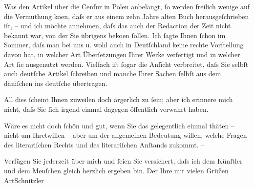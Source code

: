 \pstart
           Was den Artikel über die Cenſur in
                     Polen anbelangt,{ }ſo werden freilich wenige auf die Vermuthung ko{\geminationm}en, daſs er aus einem {\pb}zehn Jahre alten Buch herausgeſchrieben iſt, – und
               ich möchte annehmen, daſs das auch der Redaction der Zeit nicht bekannt war, von der Sie übrigens \label{K_L00602-1v}\label{K_L00602-1} beko{\geminationm}en{ }ſollen. Ich{ }ſagte Ihnen{ }ſchon im Sommer, daſs man bei uns u. wohl auch in Deutſchland keine rechte Vorſtellung davon hat, in
               welcher Art Überſetzungen Ihrer Werke verfertigt und in welcher Art{ }ſie ausgenutzt
               werden. Vielfach iſt{ }ſogar die Anſicht verbreitet, daſs Sie selbſt auch deutſche
               Artikel{ }ſchreiben und manche Ihrer Sachen{ }ſelbſt aus dem däniſchen ins deutſche übertragen.\pend
           
\pstart
           {\pb}All dies{ }ſcheint Ihnen zuweilen doch ärgerlich zu{ }ſein; aber ich erinnere mich nicht, daſs Sie{ }ſich irgend einmal dagegen öffentlich
               verwahrt haben.\pend
           
\pstart
           Wäre es nicht doch{ }ſchön und gut, wenn Sie das gelegentlich einmal thäten – nicht um
               Ihretwillen – aber um der allgemeinen Bedeutung willen, welche Fragen des
               literariſchen Rechts und des literariſchen Anſtands zukommt. –\pend
           
\pstart
           Verfügen Sie jederzeit über mich und{ }ſeien Sie versichert, daſs ich dem Künſtler und
               dem Menſchen gleich herzlich ergeben bin.\pend
           \pstart Der Ihre mit vielen Grüßen \spacefill\mbox{ArtSchnitzler}\pend{}\endnumbering{}  \newcommand{\dateiname}{L00602}\newcommand{\titel}{Arthur Schnitzler an Georg Brandes, 8. 10. 1896}\newcommand{\editorInnen}{Martin Anton Müller und Gerd-Hermann Susen}
